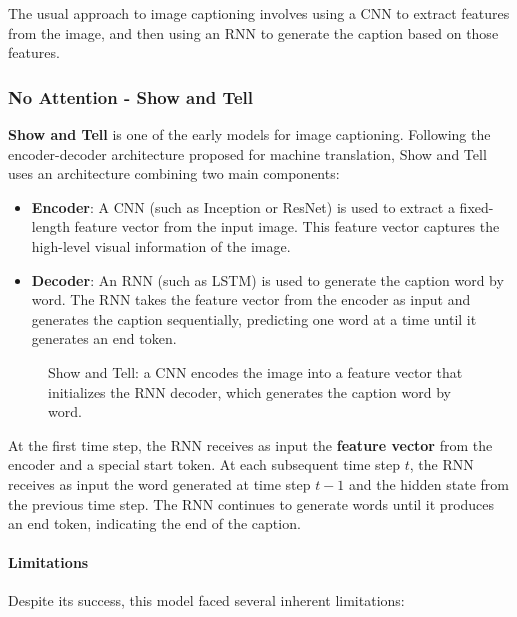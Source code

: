 The usual approach to image captioning involves using a CNN to extract features from the image,
and then using an RNN to generate the caption based on those features.

\subsubsection{No Attention - Show and Tell}
\textbf{Show and Tell} is one of the early models for image captioning. Following the encoder-decoder architecture proposed for machine translation,
Show and Tell uses an architecture combining two main components:

\begin{itemize}

    \item \textbf{Encoder}: A CNN (such as Inception or ResNet) is used to extract a fixed-length feature vector from the input image.
    This feature vector captures the high-level visual information of the image.

    \item \textbf{Decoder}: An RNN (such as LSTM) is used to generate the caption word by word.
    The RNN takes the feature vector from the encoder as input and generates the caption sequentially, predicting one word at a time until it generates an end token.
\end{itemize}

\begin{figure}[H]
    \centering
    \resizebox{\textwidth}{!}{}
    \caption{Show and Tell: a CNN encodes the image into a feature vector that initializes the RNN decoder, which generates the caption word by word.}
\end{figure}
At the first time step, the RNN receives as input the \textbf{feature vector} from the encoder and a special start token.
At each subsequent time step $t$, the RNN receives as input the word generated at time step $t-1$ and the hidden state from the previous time step.
The RNN continues to generate words until it produces an end token, indicating the end of the caption.

\paragraph{Limitations}
Despite its success, this model faced several inherent limitations:

